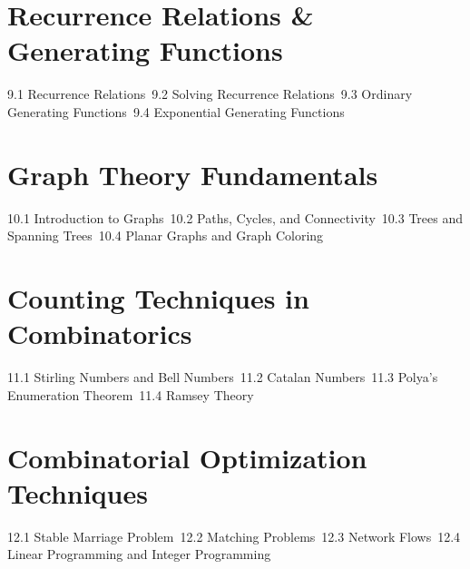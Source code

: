 \section{Recurrence Relations \& Generating Functions}
9.1 Recurrence Relations\
9.2 Solving Recurrence Relations\
9.3 Ordinary Generating Functions\
9.4 Exponential Generating Functions\
\section{Graph Theory Fundamentals}
10.1 Introduction to Graphs\
10.2 Paths, Cycles, and Connectivity\
10.3 Trees and Spanning Trees\
10.4 Planar Graphs and Graph Coloring\
\section{Counting Techniques in Combinatorics}
11.1 Stirling Numbers and Bell Numbers\
11.2 Catalan Numbers\
11.3 Polya's Enumeration Theorem\
11.4 Ramsey Theory\
\section{Combinatorial Optimization Techniques}
12.1 Stable Marriage Problem\
12.2 Matching Problems\
12.3 Network Flows\
12.4 Linear Programming and Integer Programming\

